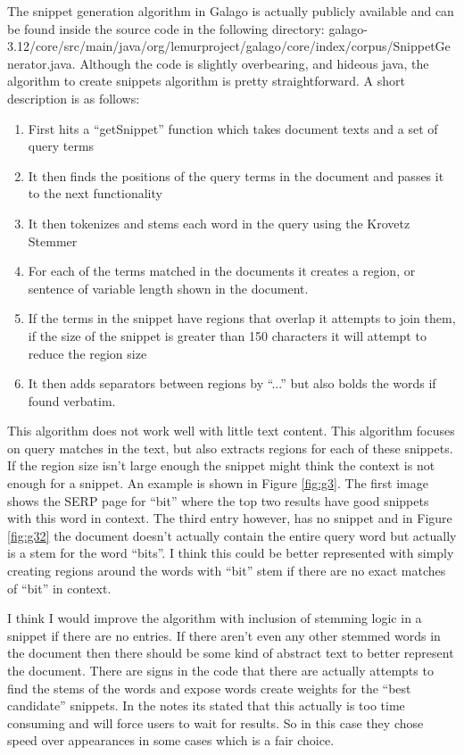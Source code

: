\documentclass[letterpaper,11pt]{article}
\begin{document}
The snippet generation algorithm in Galago is actually publicly available and can be found inside the source code in the following directory: {galago-3.12/core/src/main/java/org/lemurproject/galago/core/index/corpus/SnippetGenerator.java}.
Although the code is slightly overbearing, and hideous java, the algorithm to create snippets algorithm is pretty straightforward.
A short description is as follows:

\begin{enumerate}
  \item First hits a ``getSnippet'' function which takes document texts and a set of query terms
  \item It then finds the positions of the query terms in the document and passes it to the next functionality
  \item It then tokenizes and stems each word in the query using the Krovetz Stemmer
  \item For each of the terms matched in the documents it creates a region, or sentence of variable length shown in the document.
  \item If the terms in the snippet have regions that overlap it attempts to join them, if the size of the snippet is greater than 150 characters it will attempt to reduce the region size
  \item It then adds separators between regions by ``...'' but also bolds the words if found verbatim.
\end{enumerate}

This algorithm does not work well with little text content.
This algorithm focuses on query matches in the text, but also extracts regions for each of these snippets.
If the region size isn't large enough the snippet might think the context is not enough for a snippet.
An example is shown in Figure \ref{fig:g3}.
The first image shows the SERP page for ``bit'' where the top two results have good snippets with this word in context.
The third entry however, has no snippet and in Figure \ref{fig:g32} the document doesn't actually contain the entire query word but actually is a stem for the word ``bits''.
I think this could be better represented with simply creating regions around the words with ``bit'' stem if there are no exact matches of ``bit'' in context.

I think I would improve the algorithm with inclusion of stemming logic in a snippet if there are no entries.
If there aren't even any other stemmed words in the document then there should be some kind of abstract text to better represent the document.
There are signs in the code that there are actually attempts to find the stems of the words and expose words create weights for the ``best candidate'' snippets.
In the notes its stated that this actually is too time consuming and will force users to wait for results.
So in this case they chose speed over appearances in some cases which is a fair choice.
\end{document}
